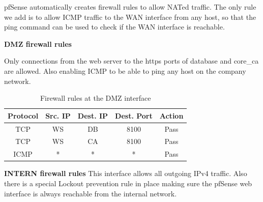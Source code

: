 \documentclass[english]{article}
\begin{document}
pfSense automatically creates firewall rules to allow NATed traffic. The only rule we add is to allow ICMP traffic to the WAN interface from any host, so that the ping command can be used to check if the WAN interface is reachable.



\textbf{DMZ firewall rules}

Only connections from the web server to the https ports of database and core\_ca are allowed. Also enabling ICMP to be able to ping any host on the company network.

\begin{table}[h]
\centering
\begin{tabular}{|c|c|c|c|c|}
\hline
\textbf{Protocol} & \textbf{Src. IP} & \textbf{Dest. IP} & \textbf{Dest. Port} & \textbf{Action} \\ \hline
TCP & WS & DB & 8100 & Pass\\ \hline
TCP & WS & CA & 8100 & Pass \\ \hline
ICMP & * & * & * & Pass \\ \hline

\end{tabular}
\caption{Firewall rules at the DMZ interface}
\label{fw_dmz}
\end{table}



\textbf{INTERN firewall rules}
This interface allows all outgoing IPv4 traffic. Also there is a special Lockout prevention rule in place making sure the pfSense web interface is always reachable from the internal network.
\end{document}
